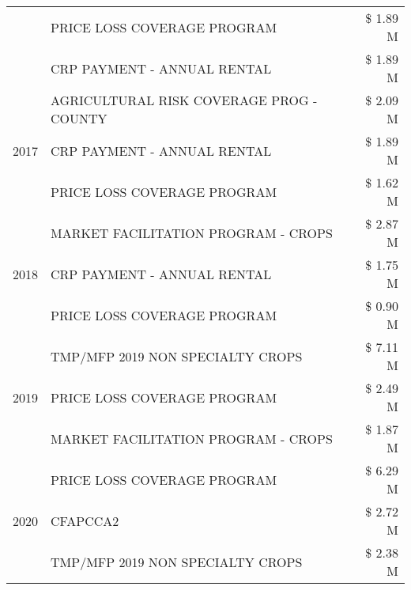 \begin{tabular}{llr}
 & PRICE LOSS COVERAGE PROGRAM & \$ 1.89 M \\
 & CRP PAYMENT - ANNUAL RENTAL & \$ 1.89 M \\
\cline{1-3}
\multirow[t]{3}{*}{2017} & AGRICULTURAL RISK COVERAGE PROG - COUNTY & \$ 2.09 M \\
 & CRP PAYMENT - ANNUAL RENTAL & \$ 1.89 M \\
 & PRICE LOSS COVERAGE PROGRAM & \$ 1.62 M \\
\cline{1-3}
\multirow[t]{3}{*}{2018} & MARKET FACILITATION PROGRAM - CROPS & \$ 2.87 M \\
 & CRP PAYMENT - ANNUAL RENTAL & \$ 1.75 M \\
 & PRICE LOSS COVERAGE PROGRAM & \$ 0.90 M \\
\cline{1-3}
\multirow[t]{3}{*}{2019} & TMP/MFP 2019 NON SPECIALTY CROPS & \$ 7.11 M \\
 & PRICE LOSS COVERAGE PROGRAM & \$ 2.49 M \\
 & MARKET FACILITATION PROGRAM - CROPS & \$ 1.87 M \\
\cline{1-3}
\multirow[t]{3}{*}{2020} & PRICE LOSS COVERAGE PROGRAM & \$ 6.29 M \\
 & CFAPCCA2 & \$ 2.72 M \\
 & TMP/MFP 2019 NON SPECIALTY CROPS & \$ 2.38 M \\
\cline{1-3}
\bottomrule
\end{tabular}
